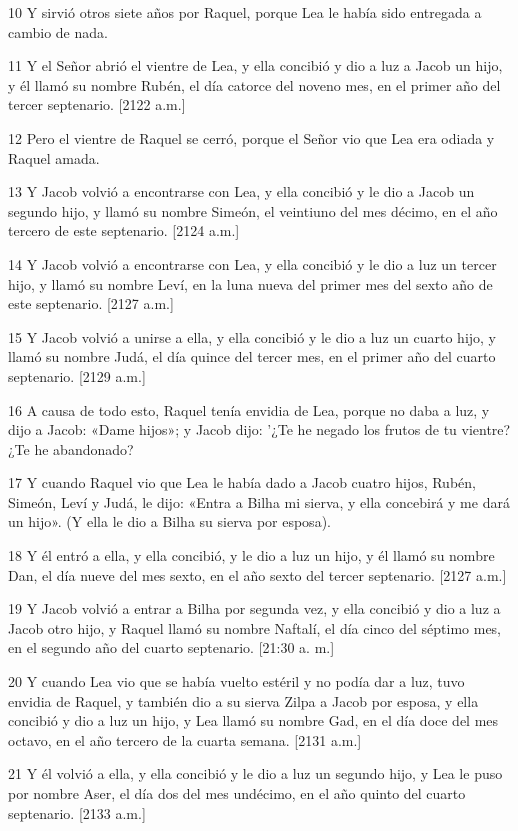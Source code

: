 \par 10 Y sirvió otros siete años por Raquel, porque Lea le había sido entregada a cambio de nada.
\par 11 Y el Señor abrió el vientre de Lea, y ella concibió y dio a luz a Jacob un hijo, y él llamó su nombre Rubén, el día catorce del noveno mes, en el primer año del tercer septenario. [2122 a.m.]
\par 12 Pero el vientre de Raquel se cerró, porque el Señor vio que Lea era odiada y Raquel amada.
\par 13 Y Jacob volvió a encontrarse con Lea, y ella concibió y le dio a Jacob un segundo hijo, y llamó su nombre Simeón, el veintiuno del mes décimo, en el año tercero de este septenario. [2124 a.m.]
\par 14 Y Jacob volvió a encontrarse con Lea, y ella concibió y le dio a luz un tercer hijo, y llamó su nombre Leví, en la luna nueva del primer mes del sexto año de este septenario. [2127 a.m.]
\par 15 Y Jacob volvió a unirse a ella, y ella concibió y le dio a luz un cuarto hijo, y llamó su nombre Judá, el día quince del tercer mes, en el primer año del cuarto septenario. [2129 a.m.]
\par 16 A causa de todo esto, Raquel tenía envidia de Lea, porque no daba a luz, y dijo a Jacob: «Dame hijos»; y Jacob dijo: '¿Te he negado los frutos de tu vientre? ¿Te he abandonado?
\par 17 Y cuando Raquel vio que Lea le había dado a Jacob cuatro hijos, Rubén, Simeón, Leví y Judá, le dijo: «Entra a Bilha mi sierva, y ella concebirá y me dará un hijo». (Y ella le dio a Bilha su sierva por esposa).
\par 18 Y él entró a ella, y ella concibió, y le dio a luz un hijo, y él llamó su nombre Dan, el día nueve del mes sexto, en el año sexto del tercer septenario. [2127 a.m.]
\par 19 Y Jacob volvió a entrar a Bilha por segunda vez, y ella concibió y dio a luz a Jacob otro hijo, y Raquel llamó su nombre Naftalí, el día cinco del séptimo mes, en el segundo año del cuarto septenario. [21:30 a. m.]
\par 20 Y cuando Lea vio que se había vuelto estéril y no podía dar a luz, tuvo envidia de Raquel, y también dio a su sierva Zilpa a Jacob por esposa, y ella concibió y dio a luz un hijo, y Lea llamó su nombre Gad, en el día doce del mes octavo, en el año tercero de la cuarta semana. [2131 a.m.]
\par 21 Y él volvió a ella, y ella concibió y le dio a luz un segundo hijo, y Lea le puso por nombre Aser, el día dos del mes undécimo, en el año quinto del cuarto septenario. [2133 a.m.]

